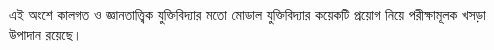 \documentclass[../../include/open-logic-part]{subfiles}
\begin{document}

\begin{editorial}
এই অংশে কালগত ও জ্ঞানতাত্ত্বিক যুক্তিবিদ্যার মতো মোডাল যুক্তিবিদ্যার কয়েকটি প্রয়োগ নিয়ে পরীক্ষামূলক খসড়া উপাদান রয়েছে।
\end{editorial}



\OLEndPartHook
\end{document}
